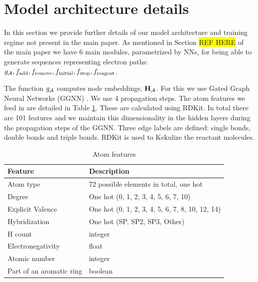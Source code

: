 \documentclass{article}
\newcommand{\highlight}[1]{\colorbox{yellow}{#1}}
\begin{document}
\section{Model architecture details}

%

In this section we provide further details of our model architecture and training regime not present in the main paper. 
As mentioned in Section \highlight{REF HERE} of the main paper we have 6 main modules, parametrized by NNs, for being able to generate sequences representing electron paths: $g_{{\mathcal{A}}}, f_{\textrm{add}}, f_{\textrm{remove}}, f_{\textrm{initial}},f_{\textrm{stop}}, f_{\textrm{reagent}}$. 

The function $g_{{\mathcal{A}}}$ computes node embeddings, ${\mathbf{H}}_{{\mathcal{A}}}$. For this we use Gated Graph Neural Networks (GGNN) \citep{li2016gated, gilmer2017neural}.
 We use 4 propagation steps. 
 The atom features we feed in are detailed in Table \ref{table:atom-features}. These are calculated using RDKit. In total there are 101 features and we maintain this dimensionality in the hidden layers during the propagation steps of the GGNN. Three edge labels are defined: single bonds, double bonds and triple bonds. RDKit is used to Kekulize the reactant molecules. 

\begin{table}
  \caption{Atom features}
  \label{table:atom-features}
  \centering
  \begin{tabular}{ll}
    \toprule
    Feature     & Description      \\
    \midrule
    Atom type & 72 possible elements in total, one hot  \\
    Degree     & One hot (0,   1,   2,   3,   4,   5,   6,   7,  10)  \\
    Explicit Valence     & One hot   (0,   1,   2,   3,   4,   5,   6,   7,   8,  10,  12,  14)    \\
    Hybridization & One hot (SP, SP2, SP3, Other) \\
    H count & integer \\
    Electronegativity & float \\
    Atomic number & integer \\
    Part of an aromatic ring & boolean\\
    \bottomrule
  \end{tabular}
\end{table}
\end{document}
